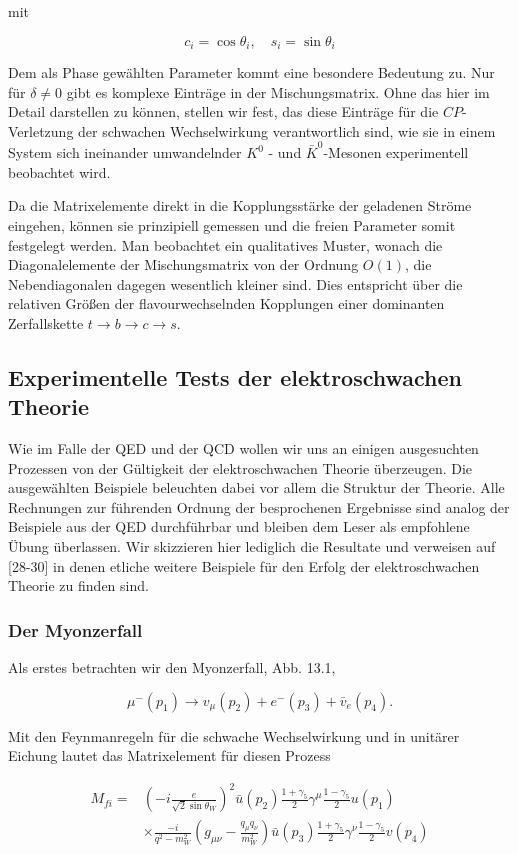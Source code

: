 \documentclass[10pt, letterpaper]{article}
\begin{document}
mit

$$
c_{i}=\cos \theta_{i}, \quad s_{i}=\sin \theta_{i}
$$

Dem als Phase gewählten Parameter kommt eine besondere Bedeutung zu. Nur für $\delta \neq 0$ gibt es komplexe Einträge in der Mischungsmatrix. Ohne das hier im Detail darstellen zu können, stellen wir fest, das diese Einträge für die $C P$-Verletzung der schwachen Wechselwirkung verantwortlich sind, wie sie in einem System sich ineinander umwandelnder $K^{0}$ - und $\bar{K}^{0}$-Mesonen experimentell beobachtet wird.

Da die Matrixelemente direkt in die Kopplungsstärke der geladenen Ströme eingehen, können sie prinzipiell gemessen und die freien Parameter somit festgelegt werden. Man beobachtet ein qualitatives Muster, wonach die Diagonalelemente der Mischungsmatrix von der Ordnung $O(1)$, die Nebendiagonalen dagegen wesentlich kleiner sind. Dies entspricht über die relativen Größen der flavourwechselnden Kopplungen einer dominanten Zerfallskette $t \rightarrow b \rightarrow c \rightarrow s$.

\subsection*{Experimentelle Tests der elektroschwachen Theorie}
Wie im Falle der QED und der QCD wollen wir uns an einigen ausgesuchten Prozessen von der Gültigkeit der elektroschwachen Theorie überzeugen. Die ausgewählten Beispiele beleuchten dabei vor allem die Struktur der Theorie. Alle Rechnungen zur führenden Ordnung der besprochenen Ergebnisse sind analog der Beispiele aus der QED durchführbar und bleiben dem Leser als empfohlene Übung überlassen. Wir skizzieren hier lediglich die Resultate und verweisen auf [28-30] in denen etliche weitere Beispiele für den Erfolg der elektroschwachen Theorie zu finden sind.

\subsubsection*{Der Myonzerfall}
Als erstes betrachten wir den Myonzerfall, Abb. 13.1,

$$
\mu^{-}\left(p_{1}\right) \rightarrow v_{\mu}\left(p_{2}\right)+e^{-}\left(p_{3}\right)+\bar{v}_{e}\left(p_{4}\right) .
$$

Mit den Feynmanregeln für die schwache Wechselwirkung und in unitärer Eichung lautet das Matrixelement für diesen Prozess

$$
\begin{aligned}
M_{f i}= & \left(-i \frac{e}{\sqrt{2} \sin \theta_{W}}\right)^{2} \bar{u}\left(p_{2}\right) \frac{1+\gamma_{5}}{2} \gamma^{\mu} \frac{1-\gamma_{5}}{2} u\left(p_{1}\right) \\
& \times \frac{-i}{q^{2}-m_{W}^{2}}\left(g_{\mu \nu}-\frac{q_{\mu} q_{\nu}}{m_{W}^{2}}\right) \bar{u}\left(p_{3}\right) \frac{1+\gamma_{5}}{2} \gamma^{\nu} \frac{1-\gamma_{5}}{2} v\left(p_{4}\right)
\end{aligned}
$$
\end{document}
